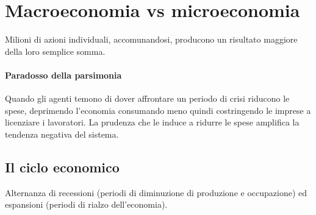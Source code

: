 \documentclass{report}
\begin{document}
	\section{Macroeconomia vs microeconomia}
	Milioni di azioni individuali, accomunandosi, producono un risultato maggiore della loro semplice somma.
	\paragraph{Paradosso della parsimonia} Quando gli agenti temono di dover affrontare un periodo di crisi riducono le spese, deprimendo l'economia consumando meno quindi costringendo le imprese a licenziare i lavoratori. La prudenza che le induce a ridurre le spese amplifica la tendenza negativa del sistema.
	\subsection{Il ciclo economico}
	Alternanza di recessioni (periodi di diminuzione di produzione e occupazione) ed espansioni (periodi di rialzo dell'economia).\\
	
	
\end{document}
